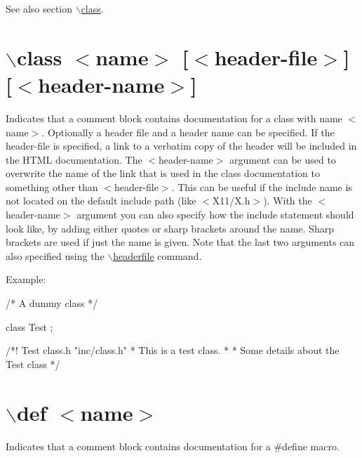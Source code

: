 \begin{DoxySeeAlso}{See also}
section \hyperlink{commands_cmdclass}{$\backslash$class}.
\end{DoxySeeAlso}


 \hypertarget{commands_cmdclass}{}\section{$\backslash$class $<$name$>$ \mbox{[}$<$header-\/file$>$\mbox{]} \mbox{[}$<$header-\/name$>$\mbox{]}}\label{commands_cmdclass}
 Indicates that a comment block contains documentation for a class with name $<$name$>$. Optionally a header file and a header name can be specified. If the header-\/file is specified, a link to a verbatim copy of the header will be included in the HTML documentation. The $<$header-\/name$>$ argument can be used to overwrite the name of the link that is used in the class documentation to something other than $<$header-\/file$>$. This can be useful if the include name is not located on the default include path (like $<$X11/X.h$>$). With the $<$header-\/name$>$ argument you can also specify how the include statement should look like, by adding either quotes or sharp brackets around the name. Sharp brackets are used if just the name is given. Note that the last two arguments can also specified using the \hyperlink{commands_cmdheaderfile}{$\backslash$headerfile} command.

\begin{DoxyParagraph}{Example: }

\begin{DoxyVerbInclude}
/* A dummy class */

class Test
{
};

/*! \class Test class.h "inc/class.h"
 *  \brief This is a test class.
 *
 * Some details about the Test class
 */
\end{DoxyVerbInclude}
 
\end{DoxyParagraph}


 \hypertarget{commands_cmddef}{}\section{$\backslash$def $<$name$>$}\label{commands_cmddef}
 Indicates that a comment block contains documentation for a {\ttfamily \#define} macro.

